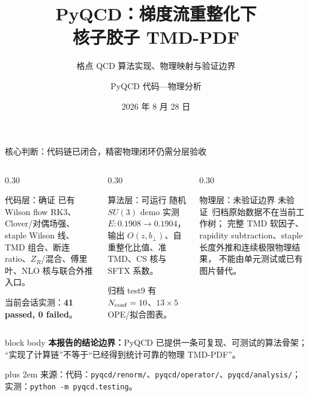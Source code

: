 \documentclass[UTF8,aspectratio=169,11pt]{ctexbeamer}
\title[PyQCD 梯度流胶子 TMD-PDF]{PyQCD：梯度流重整化下\\核子胶子 TMD-PDF}
\subtitle{格点 QCD 算法实现、物理映射与验证边界}
\author[代码—物理分析]{PyQCD 代码—物理分析}
\institute{格点 QCD：从规范组态到可检验的胶子 TMD 链}
\date{2026 年 8 月 28 日}
\newcommand{\source}[1]{%
  \par\vspace{0.02em}\begingroup\fontsize{6}{6.8}\selectfont\raggedright\sloppy
  \setlength{\emergencystretch}{3em}\rightskip=0pt plus 2em
  \color{muted}来源：#1\par\endgroup}
\newcommand{\unverified}{\textcolor{warning}{未验证}}
\begin{document}
\begin{frame}[plain]
  \titlepage
\end{frame}

\begin{frame}[t]{核心判断：代码链已闭合，精密物理闭环仍需分层验收}
  \begin{columns}[T,totalwidth=\textwidth]
    \begin{column}{0.30\textwidth}
      \begin{block}{代码层：确证}
        已有 Wilson flow RK3、Clover/对偶场强、staple Wilson 线、
        TMD 组合、断连 ratio、\(Z_R\)/混合、傅里叶、NLO 核与联合外推入口。

        \vspace{0.2em}
        当前会话实测：\textbf{41 passed, 0 failed}。
      \end{block}
    \end{column}
    \begin{column}{0.30\textwidth}
      \begin{block}{算法层：可运行}
        随机 \(SU(3)\) demo 实测
        \(E:0.1908\to0.1904\)，输出
        \(O(z,b_\perp)\)、自重整化比值、准 TMD、CS 核与 SFTX 系数。

        归档 test9 有 \(N_{\rm conf}=10\)、\(13\times5\) OPE/拟合图表。
      \end{block}
    \end{column}
    \begin{column}{0.30\textwidth}
      \begin{block}{物理层：未验证边界}
        \unverified\ 归档原始数据不在当前工作树；
        完整 TMD 软因子、rapidity subtraction、staple 长度外推和连续极限物理结果，
        不能由单元测试或已有图片替代。
      \end{block}
    \end{column}
  \end{columns}
  \vfill
  \begin{beamercolorbox}[wd=0.98\textwidth,sep=0.65em,rounded=true]{block body}
    \textbf{本报告的结论边界：}PyQCD 已提供一条可复现、可测试的算法骨架；
    “实现了计算链”不等于“已经得到统计可靠的物理 TMD-PDF”。
  \end{beamercolorbox}
  \source{代码：\nolinkurl{pyqcd/renorm/}、\nolinkurl{pyqcd/operator/}、\nolinkurl{pyqcd/analysis/}；实测：\nolinkurl{python -m pyqcd.testing}。}
\end{frame}
\end{document}

